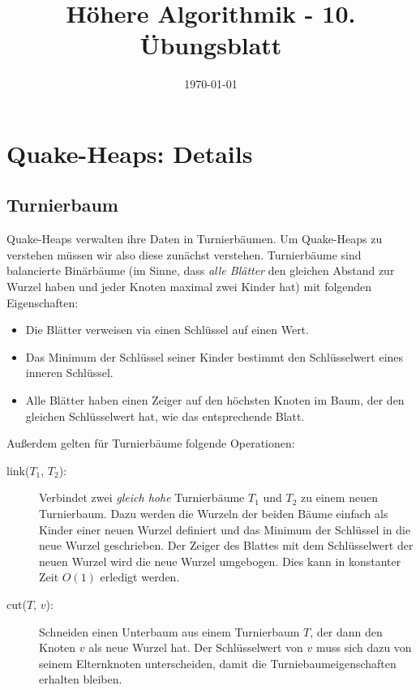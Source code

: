\documentclass[a4paper,10pt]{article}
\title{H\"ohere Algorithmik - 10. \"Ubungsblatt}
\author{\Authors}
\date{\today}
\begin{document}
\maketitle

\section{Quake-Heaps: Details}
\subsection{Turnierbaum}
Quake-Heaps verwalten ihre Daten in Turnierbäumen. 
Um Quake-Heaps zu verstehen müssen wir also diese zunächst verstehen.
Turnierbäume sind balancierte Binärbäume (im Sinne, dass \emph{alle Blätter} den gleichen Abstand zur Wurzel haben und jeder Knoten maximal zwei Kinder hat) mit folgenden Eigenschaften:
\begin{itemize}
 \item Die Blätter verweisen via einen Schlüssel auf einen Wert.
 \item Das Minimum der Schlüssel seiner Kinder bestimmt den Schlüsselwert eines inneren Schlüssel.
 \item Alle Blätter haben einen Zeiger auf den höchsten Knoten im Baum, der den gleichen Schlüsselwert hat, wie das entsprechende Blatt.
\end{itemize}
Außerdem gelten für Turnierbäume folgende Operationen:
\begin{description}
\item[link($T_1$, $T_2$):]
    Verbindet zwei \emph{gleich hohe} Turnierbäume $T_1$ und $T_2$ zu einem neuen Turnierbaum. 
    Dazu werden die Wurzeln der beiden Bäume einfach als Kinder einer neuen Wurzel definiert und das Minimum der Schlüssel in die neue Wurzel geschrieben. 
    Der Zeiger des Blattes mit dem Schlüsselwert der neuen Wurzel wird die neue Wurzel umgebogen.
    Dies kann in konstanter Zeit $O(1)$ erledigt werden.
\item[cut($T$, $v$):]
    Schneiden einen Unterbaum aus einem Turnierbaum $T$, der dann den Knoten $v$ als neue Wurzel hat. 
    Der Schlüsselwert von $v$ muss sich dazu von seinem Elternknoten unterscheiden, damit die Turniebaumeigenschaften erhalten bleiben.
\end{description}
\end{document}
